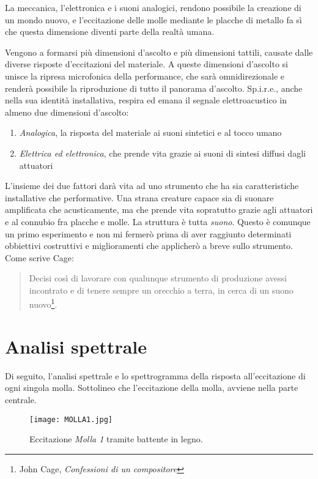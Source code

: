 La meccanica, l'elettronica e i suoni analogici, rendono possibile la creazione di un mondo nuovo, e l'eccitazione delle molle mediante le placche di metallo fa sì che questa dimensione diventi parte della realtà umana.

Vengono a formarsi più dimensioni d'ascolto e più dimensioni tattili, causate dalle diverse risposte d'eccitazioni del materiale. A queste dimensioni d'ascolto si unisce la ripresa microfonica della performance, che sarà omnidirezionale e renderà possibile la riproduzione di tutto il panorama d'ascolto. Sp.i.r.e., anche nella sua identità installativa, respira ed emana il segnale elettroacustico in almeno due dimensioni d'ascolto:
\begin{enumerate}
\item{\textit{Analogica}, la risposta del materiale ai suoni sintetici e al tocco umano}
\item{\textit{Elettrica ed elettronica}, che prende vita grazie ai suoni di sintesi diffusi dagli attuatori}
\end{enumerate}

L'insieme dei due fattori darà vita ad uno strumento che ha sia caratteristiche installative che performative. Una strana creature capace sia di suonare amplificata che acusticamente, ma che prende vita sopratutto grazie agli attuatori e al connubio fra placche e molle. La struttura è tutta \textit{suono}. Questo è comunque un primo esperimento e non mi fermerò prima di aver raggiunto determinati obbiettivi costruttivi e miglioramenti che applicherò a breve sullo strumento. Come scrive Cage:
\begin{small}
\begin{quotation}
Decisi così di lavorare con qualunque strumento di produzione avessi incontrato e di tenere sempre un orecchio a terra, in cerca di un suono nuovo\footnote{John Cage, \textit{Confessioni di un compositore}}.
\end{quotation}
\end{small}

\section{Analisi spettrale}
Di seguito, l'analisi spettrale e lo spettrogramma della risposta all'eccitazione di ogni singola molla. Sottolineo che l'eccitazione della molla, avviene nella parte centrale. \\

\begin{figure}[htbp]
\begin{center}
\texttt{[image: MOLLA1.jpg]}
\caption{Eccitazione \textit{Molla 1} tramite battente in legno.}
\label{default}
\end{center}
\end{figure}

